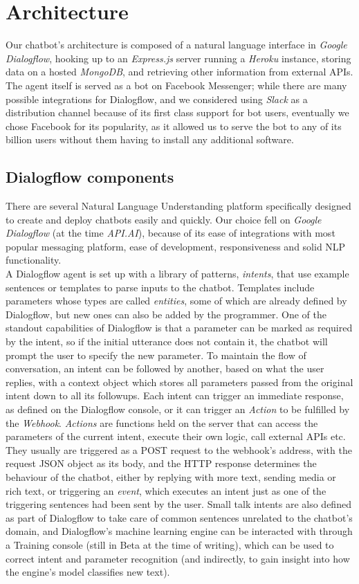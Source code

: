 \section{Architecture}
Our chatbot's architecture is composed of a natural language interface in \textit{Google Dialogflow}, hooking up to an \textit{Express.js} server running a \textit{Heroku} instance, storing data on a hosted \textit{MongoDB}, and retrieving other information from external APIs. The agent itself is served as a bot on Facebook Messenger; while there are many possible integrations for Dialogflow, and we considered using \textit{Slack} as a distribution channel because of its first class support for bot users, eventually we chose Facebook for its popularity, as it allowed us to serve the bot to any of its billion users without them having to install any additional software.
\subsection{Dialogflow components}
There are several Natural Language Understanding platform specifically designed to create and deploy chatbots easily and quickly. Our choice fell on \textit{Google Dialogflow} (at the time \textit{API.AI}), because of its ease of integrations with most popular messaging platform, ease of development, responsiveness and solid NLP functionality. \\
A Dialogflow agent is set up with a library of patterns, \textit{intents}, that use example sentences or templates to parse inputs to the chatbot. Templates include parameters whose types are called \textit{entities}, some of which are already defined by Dialogflow, but new ones can also be added by the programmer. One of the standout capabilities of Dialogflow is that a parameter can be marked as required by the intent, so if the initial utterance does not contain it, the chatbot will prompt the user to specify the new parameter. To maintain the flow of conversation, an intent can be followed by another, based on what the user replies, with a context object which stores all parameters passed from the original intent down to all its followups. Each intent can trigger an immediate response, as defined on the Dialogflow console, or it can trigger an \textit{Action} to be fulfilled by the \textit{Webhook}. \textit{Actions} are functions held on the server that can access the parameters of the current intent, execute their own logic, call external APIs etc. They usually are triggered as a POST request to the webhook's address, with the request JSON object as its body, and the HTTP response determines the behaviour of the chatbot, either by replying with more text, sending media or rich text, or triggering an \textit{event}, which executes an intent just as one of the triggering sentences had been sent by the user. Small talk intents are also defined as part of Dialogflow to take care of common sentences unrelated to the chatbot's domain, and Dialogflow's machine learning engine can be interacted with through a Training console (still in Beta at the time of writing), which can be used to correct intent and parameter recognition (and indirectly, to gain insight into how the engine's model classifies new text).


